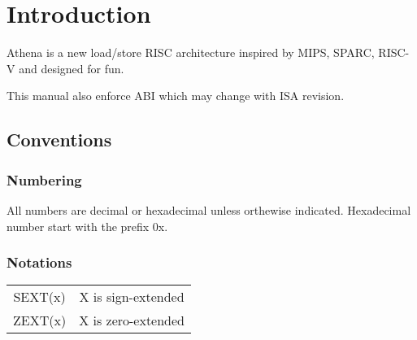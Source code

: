 \chapter{Introduction}

Athena is a new load/store RISC architecture inspired by MIPS, SPARC, 
RISC-V and designed for fun.


This manual also enforce ABI which may change with ISA revision.

\section{Conventions}

\subsection{Numbering}

All numbers are decimal or hexadecimal unless orthewise indicated.
Hexadecimal number start with the prefix 0x.

\subsection{Notations}

\begin{tabular}{ | c | c | }
    \hline
    SEXT(x) & X is sign-extended \\
    ZEXT(x) & X is zero-extended \\
    \hline
\end{tabular}
